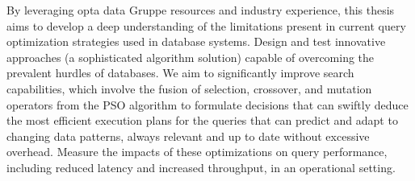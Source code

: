 By leveraging opta data Gruppe resources and industry experience, this thesis aims to develop a deep understanding of the limitations present in current query optimization strategies used in database systems. Design and test innovative approaches (a sophisticated algorithm solution) capable of overcoming the prevalent hurdles of databases. We aim to significantly improve search capabilities, which involve the fusion of selection, crossover, and mutation operators from the PSO algorithm to formulate decisions that can swiftly deduce the most efficient execution plans for the queries that can predict and adapt to changing data patterns, always relevant and up to date without excessive overhead. Measure the impacts of these optimizations on query performance, including reduced latency and increased throughput, in an operational setting. \vspace{.4cm}










